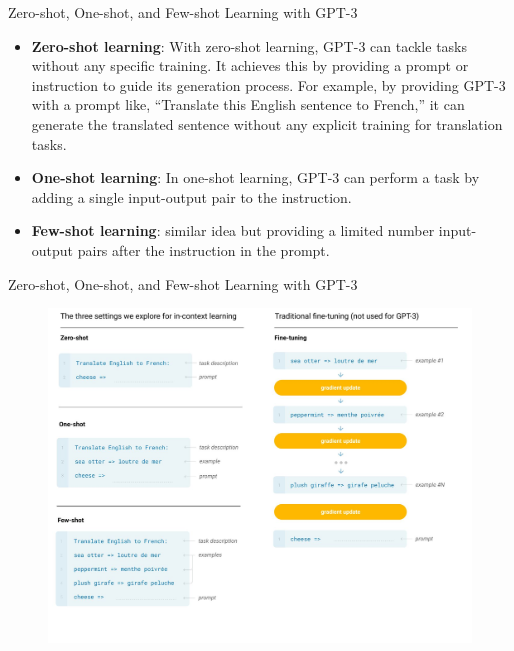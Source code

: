 \documentclass[handout]{beamer}
\begin{document}
\begin{frame}{Zero-shot, One-shot, and Few-shot Learning with GPT-3}
\begin{scriptsize}
\begin{itemize}
\item \textbf{Zero-shot learning}: With zero-shot learning, GPT-3 can tackle tasks  without any specific training. It achieves this by providing a prompt or instruction to guide its generation process. For example, by providing GPT-3 with a prompt like, ``Translate this English sentence to French,'' it can generate the translated sentence without any explicit training for translation tasks.
\item \textbf{One-shot learning}: In one-shot learning, GPT-3 can perform a task by adding a single input-output pair to the instruction.
\item \textbf{Few-shot learning}: similar idea but providing a limited number input-output pairs after the instruction in the prompt.
\end{itemize}
\end{scriptsize}
\end{frame}



\begin{frame}{Zero-shot, One-shot, and Few-shot Learning with GPT-3}


 \begin{figure}[h]
        	\includegraphics[scale = 0.18]{pics/zeroonefew.png}
        \end{figure}  



\end{frame}
\end{document}
